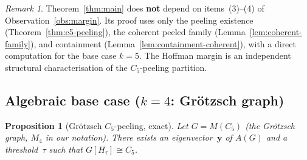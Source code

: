 \documentclass[11pt,a4paper]{amsart}
\theoremstyle{plain}
\newtheorem{proposition}[theorem]{Proposition}
\theoremstyle{definition}
\theoremstyle{remark}
\newtheorem{remark}[theorem]{Remark}
\begin{document}
\begin{remark}\label{rem:margin-not-needed}
Theorem~\ref{thm:main} does \textbf{not} depend on items~(3)--(4) of
Observation~\ref{obs:margin}.  Its proof uses only the peeling existence
(Theorem~\ref{thm:c5-peeling}), the coherent peeled family
(Lemma~\ref{lem:coherent-family}), and containment
(Lemma~\ref{lem:containment-coherent}), with a direct computation for the base
case $k=5$.
The Hoffman margin is an independent structural characterisation of the
$C_5$-peeling partition.
\end{remark}

\subsection{Algebraic base case (\texorpdfstring{$k = 4$}{k=4}: Gr\"otzsch
graph)}\label{ssec:grotzsch}

\begin{proposition}[Gr\"otzsch $C_5$-peeling, exact]\label{prop:grotzsch}
Let $G = M(C_5)$ (the Gr\"otzsch graph, $M_4$ in our notation).  There exists
an eigenvector~$\mathbf{y}$ of $A(G)$ and a threshold~$\tau$ such that
$G[H_\tau] \cong C_5$.
\end{proposition}
\end{document}
